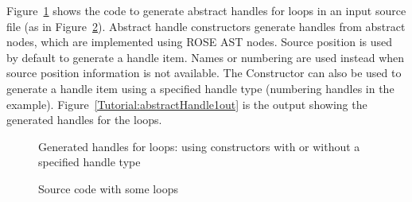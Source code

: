 Figure~\ref{Tutorial:abstractHandle1} shows the code to generate abstract
handles for loops in an input source file (as in
Figure~\ref{Tutorial:abstractHandle1input}). 
Abstract handle constructors generate handles from abstract nodes, which are implemented using ROSE AST nodes. 
Source position is used by default to generate a handle item. 
Names or numbering are used instead when source position information is not available. 
The Constructor can also be used to generate a handle item using a
specified handle type (numbering handles in the example).
Figure~\ref{Tutorial:abstractHandle1out} is the output showing the generated handles for the loops.
\begin{figure}[!h]
{\indent
{\mySmallestFontSize
\begin{latexonly}
  
\end{latexonly}

\begin{htmlonly}
   
\end{htmlonly}

}
}
\caption{Generated handles for loops: using constructors with or without a specified handle type}
\label{Tutorial:abstractHandle1}
\end{figure}
\begin{figure}[!h]
{\indent
{\mySmallestFontSize
\begin{latexonly}
  
\end{latexonly}

\begin{htmlonly}
   
\end{htmlonly}

}
}
\caption{Source code with some loops}
\label{Tutorial:abstractHandle1input}
\end{figure}


